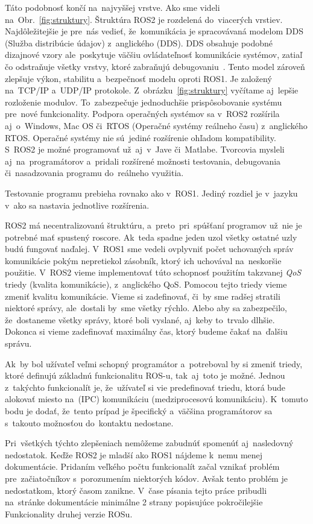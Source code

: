 Táto podobnosť končí na~najvyššej vrstve. Ako sme videli na~Obr.~\ref{fig:struktury}. Štruktúra ROS2 je rozdelená do~viacerých vrstiev.
Najdôležitejšie je pre~nás vedieť, že~komunikácia je spracovávaná modelom DDS (Služba distribúcie údajov) z~anglického
(\acrlong{DDS}). DDS obsahuje podobné dizajnové vzory ale~poskytuje väčšiu ovládateľnosť komunikácie systémov, zatiaľ
čo odstraňuje všetky vrstvy, ktoré zabraňujú debugovaniu~\cite{ElectronicDesign}. Tento model zároveň zlepšuje výkon,
stabilitu a~bezpečnosť modelu oproti ROS1. Je založený na~TCP/IP a~UDP/IP protokole. Z~obrázku~\ref{fig:struktury}
vyčítame aj~lepšie rozloženie modulov. To~zabezpečuje jednoduchšie prispôsobovanie systému pre~nové funkcionality. Podpora operačných systémov
sa v~ROS2 rozšírila aj~o~Windows, Mac OS či~RTOS (Operačné systémy reálneho času) z~anglického \acrlong{RTOS}. Operačné systémy nie sú~jediné
rozšírenie ohľadom kompatibility. S~ROS2 je možné programovať už~aj~v~Jave či~Matlabe. Tvorcovia mysleli aj~na~programátorov a~pridali rozšírené
možnosti testovania, debugovania či~nasadzovania programu do~reálneho využitia.

Testovanie programu prebieha rovnako ako v~ROS1. Jediný rozdiel je v~jazyku v~ako sa nastavia jednotlive rozšírenia.

ROS2 má necentralizovanú štruktúru, a~preto~pri~spúšťaní programov už~nie je potrebné mať spustený roscore. Ak~teda spadne jeden uzol všetky
ostatné uzly budú fungovať naďalej. V~ROS1 sme vedeli ovplyvniť počet uchovaných správ komunikácie pokým nepretiekol zásobník, ktorý ich uchovával
na~neskoršie použitie. V~ROS2 vieme implementovať túto schopnosť použitím takzvanej \textit{QoS} triedy (kvalita komunikácie), z~anglického \acrlong{QoS}.
Pomocou tejto triedy vieme zmeniť kvalitu komunikácie. Vieme si zadefinovať, či~by sme radšej stratili niektoré správy, ale~dostali by~sme
všetky rýchlo. Alebo aby sa zabezpečilo, že~dostaneme všetky správy, ktoré boli vyslané, aj~keby to~trvalo dlhšie. Dokonca si vieme zadefinovať
maximálny čas, ktorý budeme čakať na~ďalšiu správu.

Ak~by bol užívateľ veľmi schopný programátor a~potreboval by si zmeniť triedy, ktoré definujú základnú funkcionalitu ROS-u, tak~aj~toto je možné.
Jednou z~takýchto funkcionalít je, že~užívateľ si vie predefinovať triedu, ktorá bude alokovať miesto na~(IPC) komunikáciu (medziprocesovú komunikáciu).
K~tomuto bodu je dodať, že~tento prípad je špecifický a~väčšina programátorov sa s~takouto možnosťou do~kontaktu nedostane.

Pri~všetkých týchto zlepšeniach nemôžeme zabudnúť spomenúť aj~nasledovný nedostatok. Keďže ROS2 je mladší ako ROS1 nájdeme k~nemu menej dokumentácie.
Pridaním veľkého počtu funkcionalít začal vznikať problém pre~začiatočníkov s~porozumením niektorých kódov. Avšak tento problém je nedostatkom,
ktorý časom zanikne. V~čase písania tejto práce pribudli na~stránke dokumentácie minimálne 2 strany popisujúce pokročilejšie Funkcionality druhej
verzie ROSu.

